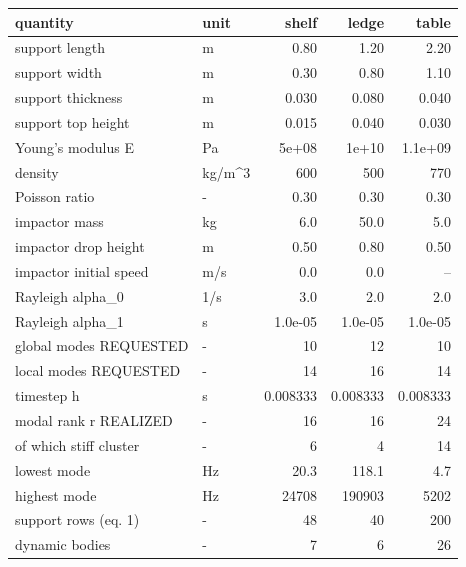 \begin{tabular}{@{}llrrr@{}}
\toprule
quantity & unit & shelf & ledge & table \\
\midrule
support length & m & 0.80 & 1.20 & 2.20 \\
support width & m & 0.30 & 0.80 & 1.10 \\
support thickness & m & 0.030 & 0.080 & 0.040 \\
support top height & m & 0.015 & 0.040 & 0.030 \\
Young's modulus E & Pa & 5e+08 & 1e+10 & 1.1e+09 \\
density & kg/m\^{}3 & 600 & 500 & 770 \\
Poisson ratio & - & 0.30 & 0.30 & 0.30 \\
impactor mass & kg & 6.0 & 50.0 & 5.0 \\
impactor drop height & m & 0.50 & 0.80 & 0.50 \\
impactor initial speed & m/s & 0.0 & 0.0 & -- \\
Rayleigh alpha\_0 & 1/s & 3.0 & 2.0 & 2.0 \\
Rayleigh alpha\_1 & s & 1.0e-05 & 1.0e-05 & 1.0e-05 \\
global modes REQUESTED & - & 10 & 12 & 10 \\
local modes REQUESTED & - & 14 & 16 & 14 \\
timestep h & s & 0.008333 & 0.008333 & 0.008333 \\
modal rank r REALIZED & - & 16 & 16 & 24 \\
  of which stiff cluster & - & 6 & 4 & 14 \\
lowest mode & Hz & 20.3 & 118.1 & 4.7 \\
highest mode & Hz & 24708 & 190903 & 5202 \\
support rows (eq. 1) & - & 48 & 40 & 200 \\
dynamic bodies & - & 7 & 6 & 26 \\
\bottomrule
\end{tabular}
